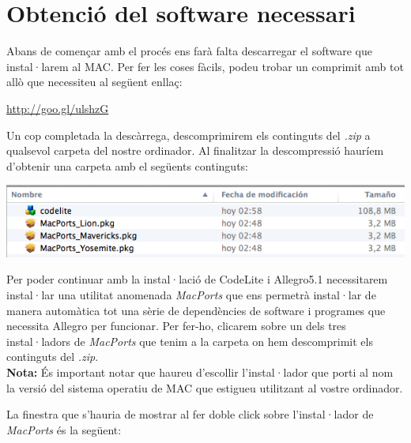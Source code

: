 \documentclass[11pt]{article}
\begin{document}
\section{Obtenció del software necessari}
Abans de començar amb el procés ens farà falta descarregar el software que instal·larem al MAC. Per fer les coses fàcils, podeu trobar un comprimit amb tot allò que necessiteu al següent enllaç:

\begin{center}
	\url{http://goo.gl/ulshzG}
\end{center}

\noindent Un cop completada la descàrrega, descomprimirem els continguts del \textit{.zip} a qualsevol carpeta del nostre ordinador. Al finalitzar la descompressió hauríem d'obtenir una carpeta amb el següents continguts:

\begin{center}
	\includegraphics[scale=0.5]{img/Zip_Contents.png}
\end{center}

\noindent Per poder continuar amb la instal·lació de CodeLite i Allegro5.1 necessitarem instal·lar una utilitat anomenada \textit{MacPorts} que ens permetrà instal·lar de manera automàtica tot una sèrie de dependències de software i programes que necessita Allegro per funcionar. Per fer-ho, clicarem sobre un dels tres instal·ladors de \textit{MacPorts} que tenim a la carpeta on hem descomprimit els continguts del \textit{.zip}. \\

\noindent \textbf{Nota:} És important notar que haureu d'escollir l'instal·lador que porti al nom la versió del sistema operatiu de MAC que estigueu utilitzant al vostre ordinador.

\newpage

\noindent La finestra que s'hauria de mostrar al fer doble click sobre l'instal·lador de \textit{MacPorts} és la següent:
\end{document}
